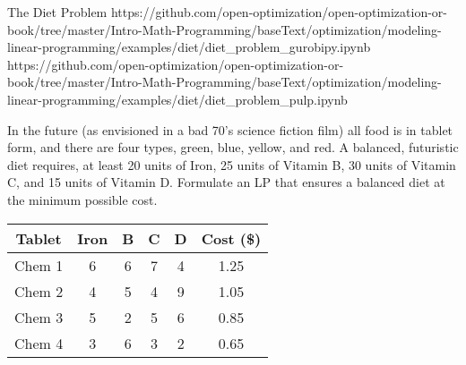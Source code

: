 \begin{examplewithallcode}{The Diet Problem}
    {}
    {https://github.com/open-optimization/open-optimization-or-book/tree/master/Intro-Math-Programming/baseText/optimization/modeling-linear-programming/examples/diet/diet_problem_gurobipy.ipynb}
    {https://github.com/open-optimization/open-optimization-or-book/tree/master/Intro-Math-Programming/baseText/optimization/modeling-linear-programming/examples/diet/diet_problem_pulp.ipynb}
    
    In the future (as envisioned in a bad 70's science fiction film) all food is in tablet form, and there are four types, green, blue, yellow, and red. A balanced, futuristic diet requires, at least 20 units of Iron, 25 units of Vitamin B, 30 units of Vitamin C, and 15 units of Vitamin D. Formulate an LP that ensures a balanced diet at the minimum possible cost.
    \end{examplewithallcode}
    
    \begin{table}[h!]
    \begin{center}
    \label{tab:pillContent}
    \begin{tabular}{|c|c|c|c|c|c|}
    \hline
    Tablet & Iron & B & C & D & Cost (\$) \\ \hline
    Chem 1 & 6 & 6 & 7 & 4 & 1.25 \\
    Chem 2 & 4 & 5 & 4 & 9 & 1.05 \\
    Chem 3 & 5 & 2 & 5 & 6 & 0.85 \\
    Chem 4 & 3 & 6 & 3 & 2 & 0.65 \\
    \hline
    \end{tabular}
    \end{center}
    \end{table}
    
